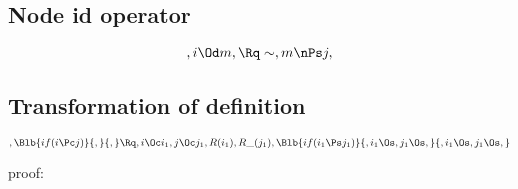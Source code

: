 \bigskip
\bigskip
\bigskip
\bigskip
\subsection{Node id operator} 
\[, i \Od m, \Rq \sim, m \nPs j, \]



\bigskip
\bigskip
\bigskip
\bigskip
\subsection{Transformation of definition } 
\[,\Blb{if(i \Pc j)}{,}{,} \Rq , i \Oc i_1, j \Oc j_1, R(i_1), R\_(j_1), \Blb{if(i_1 \Ps j_1)}{, i_1 \Os, j_1 \Os,}{, i_1 \Os, j_1 \Os,}\]



\bigskip
\bigskip
\bigskip
\bigskip
proof:\\
